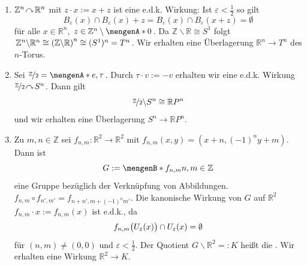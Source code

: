 \begin{enumerate}[(1)]
	\item $\mathds{Z}^n \wirkung \mathds{R}^n$ mit $z \cdot x := x + z$ ist eine e.d.k. Wirkung: Ist $\varepsilon < \frac{1}{2}$ so gilt 
	\[
		B_\varepsilon(x) \cap B_\varepsilon(x) + z = B_\varepsilon(x) \cap B_\varepsilon(x +z) = \emptyset
	\]
	für alle $x \in \mathds{R}^n$, $z \in \mathds{Z}^n \setminus \set{0}$. Da $\mathds{Z} \backslash \mathds{R} \cong S^1$ folgt 
	$\mathds{Z}^n \backslash \mathds{R}^n \cong \enbrace*{\mathds{Z} \backslash \mathds{R}}^n \cong (S^1)^n = T^n $. Wir erhalten eine Überlagerung $\mathds{R}^n \to T^n$ 
	des $n$-Torus.
	\item Sei $\nicefrac{\mathds{Z}}{2} = \set{e, \tau}$. Durch $\tau \cdot v := - v$ erhalten wir eine e.d.k. Wirkung $\nicefrac{\mathds{Z}}{2} \wirkung S^n$. Dann gilt
	\[
		\nicefrac{\mathds{Z}}{2} \backslash S^n \cong \mathds{R}P^n
	\]
	und wir erhalten eine Überlagerung $S^n \to \mathds{R}P^n$. 
	\item Zu $m,n \in \mathds{Z}$ sei $f_{n,m} : \mathds{R}^2 \to \mathds{R}^2$ mit $f_{n,m} (x,y) = (x + n, (-1)^n y + m)$. Dann ist 
	\[
		G := \set[f_{n,m}]{n,m \in \mathds{Z}} 
	\]
	eine Gruppe bezüglich der Verknüpfung von Abbildungen. $f_{n,m} \circ f_{n',m'} = f_{n+n', m+ (-1)^n m'}$. Die kanonische Wirkung von $G$ auf $\mathds{R}^2$ 
	$f_{n,m} \cdot x := f_{n,m}(x)$ ist e.d.k., da 
	\[
		f_{n,m} \enbrace[\big]{U_\varepsilon(x)} \cap U_\varepsilon(x) = \emptyset  
	\]
	für $(n,m) \not= (0,0)$ und $\varepsilon < \frac{1}{2}$. Der Quotient $G\backslash \mathds{R}^2 =: K$ heißt die . Wir erhalten eine Wirkung
	$\mathds{R}^2 \to K$.  
	\begin{figure}[h]
	\end{figure}
\end{enumerate}

